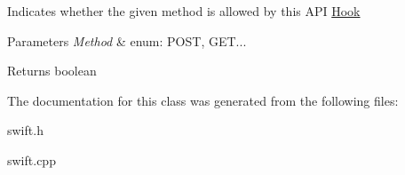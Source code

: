 Indicates whether the given method is allowed by this A\-P\-I \hyperlink{classswift_1_1_hook}{Hook} 
\begin{DoxyParams}{Parameters}
{\em Method} & enum\-: P\-O\-S\-T, G\-E\-T... \\
\hline
\end{DoxyParams}
\begin{DoxyReturn}{Returns}
boolean 
\end{DoxyReturn}


The documentation for this class was generated from the following files\-:\begin{DoxyCompactItemize}
\item 
swift.\-h\item 
swift.\-cpp\end{DoxyCompactItemize}
